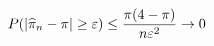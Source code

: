 \documentclass[preview]{standalone}
\begin{document}
\begin{align*}
\special{dvisvgm:raw <g id='unique000'>}P(|\widehat\pi_n-\pi|\ge\varepsilon)\le\frac{\pi(4-\pi)}{n\varepsilon^2}\to0\special{dvisvgm:raw </g>}
\end{align*}
\end{document}
